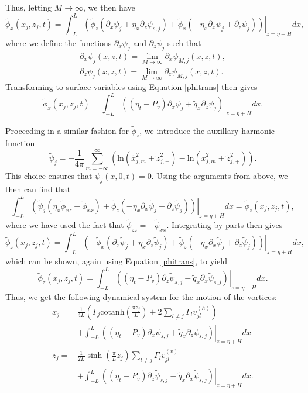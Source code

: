 \documentclass[a4paper,11pt]{article}
\newcommand{\p}{\partial}
\begin{document}
Thus, letting $M\rightarrow \infty$, we then have 
\[
\tilde{\phi}_{x}(x_{j},z_{j},t) = \int_{-L}^{L} \left.\left(\tilde{\phi}_{z}\left(\p_{x}\psi_{j}+ \eta_{x}\p_{z}\psi_{s,j}\right)+\tilde{\phi}_{x}\left(-\eta_{x}\p_{x}\psi_{j} + \p_{z}\psi_{j} \right) \right)\right|_{z=\eta+H}dx,
\]
where we define the functions $\p_{x}\psi_{j}$ and $\p_{z}\psi_{j}$ such that 
\begin{align*}
\p_{x}\psi_{j}(x,z,t) = \lim_{M\rightarrow\infty}\p_{x}\psi_{M,j}(x,z,t), \\
\p_{z}\psi_{j}(x,z,t) = \lim_{M\rightarrow\infty}\p_{z}\psi_{M,j}(x,z,t).
\end{align*}
Transforming to surface variables using Equation \eqref{phitrans} then gives
\[
\tilde{\phi}_{x}(x_{j},z_{j},t) = \int_{-L}^{L}\left.\left(\left(\eta_{t}-P_{v}\right)\p_{x}\psi_{j} + \tilde{q}_{x}\p_{z}\psi_{j} \right) \right|_{z=\eta+H} dx.
\]

Proceeding in a similar fashion for $\tilde{\phi}_{z}$, we introduce the auxillary harmonic function
\[
\tilde{\psi}_{j} = -\frac{1}{4\pi}\sum_{m=-\infty}^{\infty} \left( \mbox{ln}\left( \tilde{x}_{j,m}^{2} + \tilde{z}_{j,-}^{2}  \right) - \mbox{ln}\left( \tilde{x}_{j,m}^{2} + \tilde{z}_{j,+}^{2} \right)\right).
\]
This choice ensures that $\tilde{\psi}_{j}(x,0,t) = 0$.  Using the arguments from above, we then can find that
\[
\int_{-L}^{L}\left.\left( \tilde{\psi}_{j}\left(\eta_{x}\tilde{\phi}_{xz}+\tilde{\phi}_{xx}\right)+\tilde{\phi}_{z}\left(-\eta_{x}\p_{x}\tilde{\psi}_{j}+\p_{z}\tilde{\psi}_{j}\right) \right)\right|_{z=\eta+H} dx  = \tilde{\phi}_{z}(x_{j},z_{j},t),
\]
where we have used the fact that $\tilde{\phi}_{zz} = -\tilde{\phi}_{xx}$.  Integrating by parts then gives 
\[
\tilde{\phi}_{z}(x_{j},z_{j},t) = \int_{-L}^{L}\left.\left(-\tilde{\phi}_{x}\left(\p_{x} \tilde{\psi}_{j} + \eta_{x}\p_{z} \tilde{\psi}_{j}\right) +\tilde{\phi}_{z}\left(-\eta_{x}\p_{x} \tilde{\psi}_{j}+\p_{z}\tilde{\psi}_{j}\right)\right)\right|_{z=\eta+H}dx,
\]
which can be shown, again using Equation \eqref{phitrans}, to yield
\[
\tilde{\phi}_{z}(x_{j},z_{j},t) = \int_{-L}^{L}\left.\left( \left(\eta_{t}-P_{v}\right)\p_{z}\tilde{\psi}_{s,j} - \tilde{q}_{x}\p_{x}\tilde{\psi}_{s,j} \right)\right|_{z=\eta+H} dx.
\]
Thus, we get the following dynamical system for the motion of the vortices:
\begin{align}
\dot{x}_{j} = & \frac{1}{4L}\left(  \Gamma_{j}\mbox{cotanh}\left(\frac{\pi z_{j}}{L} \right)+2\sum_{l\neq j}\Gamma_{l}v_{jl}^{(h)} \right)\nonumber\\
&  +\int_{-L}^{L}\left.\left(\left(\eta_{t}-P_{v}\right)\p_{x}\psi_{s,j} + \tilde{q}_{x}\p_{z}\psi_{s,j} \right)\right|_{z=\eta + H} dx \label{xdotb}\\
\dot{z}_{j} = &  \frac{1}{2L}\sinh\left(\frac{\pi}{L}z_{j}\right)\sum_{l\neq j} \Gamma_{l} v_{jl}^{(v)}\nonumber\\
&  + \int_{-L}^{L}\left.\left( \left(\eta_{t}-P_{v}\right)\p_{z}\tilde{\psi}_{s,j} - \tilde{q}_{x}\p_{x}\tilde{\psi}_{s,j} \right)\right|_{z=\eta + H} dx. \label{zdotb}
\end{align}
\end{document}
